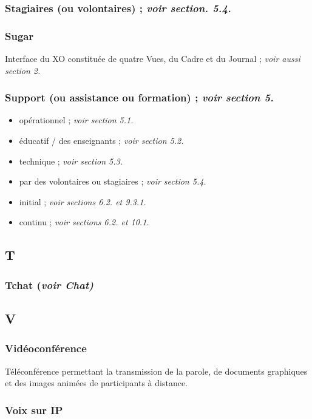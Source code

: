 \documentclass[12pt]{article}
\begin{document}
\subsubsection{Stagiaires (ou volontaires) ; \emph{voir section. 5.4.}}
\label{sec-14-15-2}
\subsubsection{Sugar}
\label{sec-14-15-3}


Interface du XO constituée de quatre Vues, du Cadre et du Journal ; \emph{voir aussi section 2.}
\subsubsection{Support (ou assistance ou formation) ; \emph{voir section 5.}}
\label{sec-14-15-4}


\begin{itemize}
\item opérationnel ; \emph{voir section 5.1.}
\item éducatif / des enseignants ; \emph{voir section 5.2.}
\item technique ; \emph{voir section 5.3.}
\item par des volontaires ou stagiaires ; \emph{voir section 5.4.}
\item initial ; \emph{voir sections 6.2. et  9.3.1.}
\item continu ; \emph{voir sections 6.2. et 10.1.}
\end{itemize}
\subsection{T}
\label{sec-14-16}
\subsubsection{Tchat (\emph{voir Chat)}}
\label{sec-14-16-1}
\subsection{V}
\label{sec-14-17}
\subsubsection{Vidéoconférence}
\label{sec-14-17-1}


Téléconférence permettant la transmission de la parole, de documents
graphiques et des images animées de participants à distance.
\subsubsection{Voix sur IP}
\label{sec-14-17-2}
\end{document}
